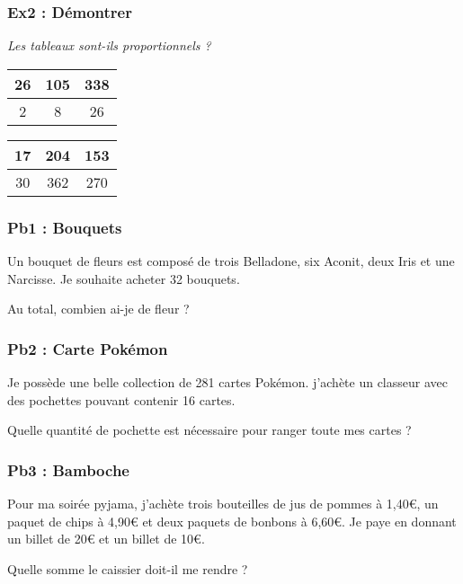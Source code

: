\subsubsection*{Ex2 : Démontrer} 

\textit{Les tableaux sont-ils proportionnels ?} 

\begin{multicols}{2}\noindent
  \begin{center}\begin{tabular}{|c|c|c|} \hline
    26 & 105 & 338 \\  \hline
    2 & 8 & 26\\  \hline
  \end{tabular}\end{center}
  \Pointilles[8]\columnbreak 

  \begin{center}\begin{tabular}{|c|c|c|} \hline
    17 & 204 & 153 \\  \hline
    30 & 362 & 270\\  \hline
  \end{tabular}\end{center}
    \Pointilles[8]
\end{multicols}
\newpage

\subsubsection*{Pb1 : Bouquets} 

Un bouquet de fleurs est composé de trois Belladone, six Aconit, deux Iris et une Narcisse. Je souhaite acheter 32 bouquets.

Au total, combien ai-je de fleur ?

\Pointilles[6] 


\subsubsection*{Pb2 : Carte Pokémon} 

Je possède une belle collection de 281 cartes Pokémon. j’achète un classeur avec des pochettes pouvant contenir 16 cartes.

Quelle quantité de pochette est nécessaire pour ranger toute mes cartes ?

\Pointilles[7]


\subsubsection*{Pb3 : Bamboche} 

Pour ma soirée pyjama, j'achète trois bouteilles de jus de pommes à 1,40€, un paquet de chips à 4,90€ et deux paquets de bonbons à 6,60€. Je paye en donnant un billet de 20€ et un billet de 10€. 

Quelle somme le caissier doit-il me rendre ?

\Pointilles[7]


